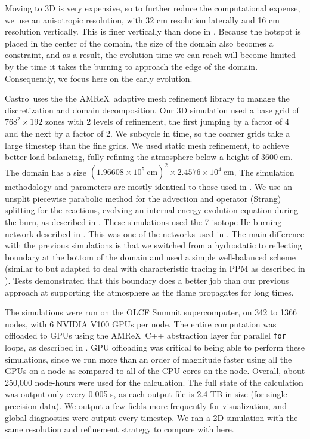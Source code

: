 \documentclass[twocolumn,linenumbers,times,tighten]{aastex631}
\newcommand{\castro}{{\sf Castro}}
\newcommand{\amrex}{{\sf AMReX}}
\begin{document}
Moving to 3D is very expensive, so to further reduce the computational
expense, we use an anisotropic resolution, with 32 cm resolution
laterally and 16 cm resolution vertically.  This is finer vertically
than done in \citet{harpole:2021}.  Because the hotspot is placed in
the center of the domain, the size of the domain also becomes a
constraint, and as a result, the evolution time we can reach will
become limited by the time it takes the burning to approach the edge
of the domain.  Consequently, we focus here on the early evolution.

\castro\ uses the the \amrex\ adaptive mesh refinement library
\citep{amrex_joss} to manage the discretization and domain
decomposition.  Our 3D simulation used a base grid of $768^2 \times
192$ zones with 2 levels of refinement, the first jumping by a factor
of 4 and the next by a factor of 2.  We subcycle in time, so the
coarser grids take a large timestep than the fine grids.  We used
static mesh refinement, to achieve better load balancing, fully
refining the atmosphere below a height of $3600~\mathrm{cm}$.  The
domain has a size $(1.96608\times 10^5~\mathrm{cm})^2 \times
2.4576\times 10^4~\mathrm{cm}$.  The simulation methodology and
parameters are mostly identical to those used in \citet{harpole:2021}.
We use an unsplit piecewise parabolic method
\citep{ppmunsplit,millercolella:2002} for the advection and operator
(Strang) splitting for the reactions, evolving an internal energy
evolution equation during the burn, as described in
\citet{strang_rnaas}.  These simulations used the 7-isotope He-burning
network described in \citet{iso7}.  This was one of the networks used
in \citet{eiden:2020}.  The main difference with the previous
simulations is that we switched from a hydrostatic to reflecting
boundary at the bottom of the domain and used a simple well-balanced
scheme (similar to \citealt{kappeli:2016} but adapted to deal with
characteristic tracing in PPM as described in \citealt{ppm-hse}).
Tests demonstrated that this boundary does a better job than our
previous approach at supporting the atmosphere as the flame propagates
for long times.

The simulations were run on the OLCF Summit supercomputer, on 342 to
1366 nodes, with 6 NVIDIA V100 GPUs per node.  The entire computation
was offloaded to GPUs using the \amrex\ C++ abstraction layer for parallel \texttt{for} loops, as described in
\citet{castro_gpu}.  GPU offloading was critical to being able to
perform these simulations, since we run more than an order of
magnitude faster using all the GPUs on a node as compared to all of
the CPU cores on the node.  Overall, about 250,000 node-hours were used for
the calculation.  The full state of the calculation was output only
every 0.005 s, as each output file is 2.4 TB in size (for single
precision data).  We output a few fields more frequently for
visualization, and global diagnostics were output every timestep.  We
ran a 2D simulation with the same resolution and refinement strategy
to compare with here.
\end{document}
